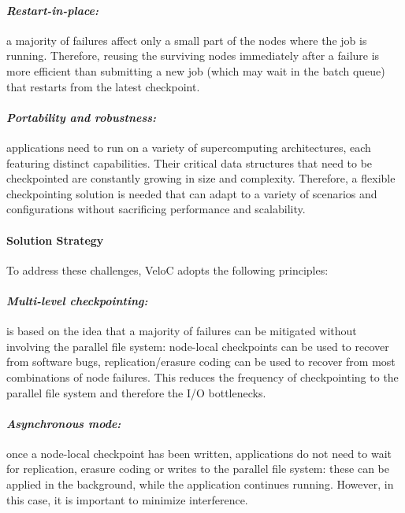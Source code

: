 \paragraph{\emph{Restart-in-place:}} a majority of failures affect
only a small part of the nodes where the job is running. Therefore,
reusing the surviving nodes immediately after a failure is more
efficient than submitting a new job (which may wait in the batch
queue) that restarts from the latest checkpoint.
\vspace{-1em}

\paragraph{\emph{Portability and robustness:}} applications need to
run on a variety of supercomputing architectures, each featuring
distinct capabilities. Their critical data structures that need to be
checkpointed are constantly growing in size and complexity. Therefore,
a flexible checkpointing solution is needed that can adapt to a
variety of scenarios and configurations without sacrificing
performance and scalability.

\paragraph{Solution Strategy}

To address these challenges, VeloC adopts the following principles:
\vspace{-1em}

\paragraph{\emph{Multi-level checkpointing:}} is based on the idea
that a majority of failures can be mitigated without involving the
parallel file system: node-local checkpoints can be used to recover
from software bugs, replication/erasure coding can be used to recover
from most combinations of node failures. This reduces the frequency of
checkpointing to the parallel file system and therefore the I/O
bottlenecks.
\vspace{-1em}

\paragraph{\emph{Asynchronous mode:}} once a node-local checkpoint has
been written, applications do not need to wait for replication,
erasure coding or writes to the parallel file system: these can be
applied in the background, while the application continues
running. However, in this case, it is important to minimize
interference.
\vspace{-1em}

